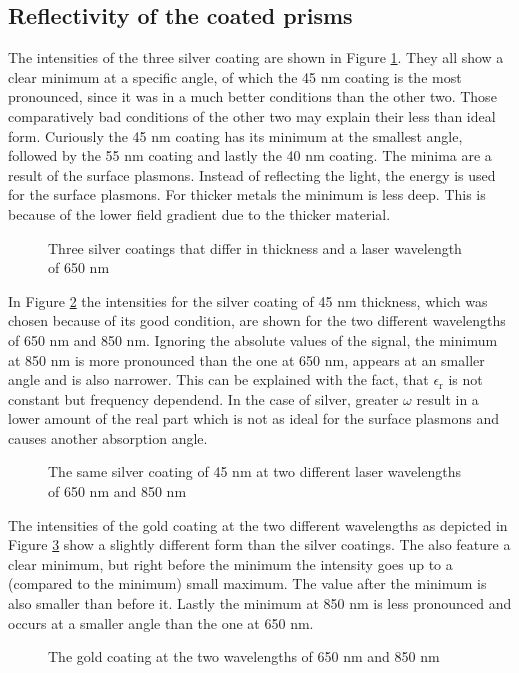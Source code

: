 \documentclass[twoside,english,headsepline=on,DIV=11]{scrartcl}
\numberwithin{equation}{section}
\begin{document}
\subsection{Reflectivity of the coated prisms}
The intensities of the three silver coating are shown in Figure \ref{fig:Ag}. They all show a clear minimum at a specific angle, of which the 45 nm coating is the most pronounced, since it was in a much better conditions than the other two. Those comparatively bad conditions of the other two may explain their less than ideal form. Curiously the 45 nm coating has its minimum at the smallest angle, followed by the 55 nm coating and lastly the 40 nm coating. The minima are a result of the surface plasmons. Instead of reflecting the light, the energy is used for the surface plasmons. For thicker metals the minimum is less deep. This is because of the lower field gradient due to the thicker material. 
\begin{figure}
	
	\caption{Three silver coatings that differ in thickness and a laser wavelength of 650 nm}
	\label{fig:Ag}
\end{figure}
In Figure \ref{fig:Ag2} the intensities for the silver coating of 45 nm thickness, which was chosen because of its good condition, are shown for the two different wavelengths of 650 nm and 850 nm. Ignoring the absolute values of the signal, the minimum at 850 nm is more pronounced than the one at 650 nm, appears at an smaller angle and is also narrower. This can be explained with the fact, that $\epsilon_\text{r}$ is not constant but frequency dependend. In the case of silver, greater $\omega$  result in a lower amount of the real part which is not as ideal for the surface plasmons and causes another absorption angle. 
\begin{figure}
	
	\caption{The same silver coating of 45 nm at two different laser wavelengths of 650 nm and 850 nm}
	\label{fig:Ag2}
\end{figure}
The intensities of the gold coating at the two different wavelengths as depicted in Figure \ref{fig:Au} show a slightly different form than the silver coatings. The also feature a clear minimum, but right before the minimum the intensity goes up to a (compared to the minimum) small maximum. The value after the minimum is also smaller than before it. Lastly the minimum at 850 nm is less pronounced and occurs at a smaller angle than the one at 650 nm.
\begin{figure}
	
	\caption{The gold coating at the two wavelengths of 650 nm and 850 nm}
	\label{fig:Au}
\end{figure}
\end{document}
